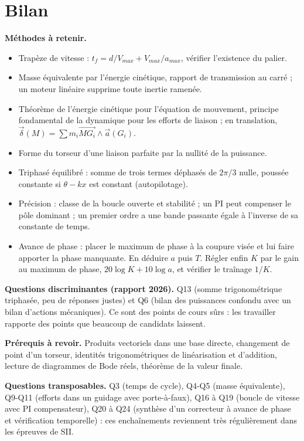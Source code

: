 \documentclass[11pt,a4paper]{article}
\providecommand{\tightlist}{\setlength{\itemsep}{0pt}\setlength{\parskip}{0pt}}
\begin{document}
\hypertarget{bilan}{%
\section{Bilan}\label{bilan}}

\textbf{Méthodes à retenir.}

\begin{itemize}
\tightlist
\item
  Trapèze de vitesse : \(t_f=d/V_{max}+V_{max}/a_{max}\), vérifier l'existence du palier.
\item
  Masse équivalente par l'énergie cinétique, rapport de transmission au carré ; un moteur linéaire supprime toute inertie ramenée.
\item
  Théorème de l'énergie cinétique pour l'équation de mouvement, principe fondamental de la dynamique pour les efforts de liaison ; en translation, \(\vec\delta(M)=\sum m_i\overrightarrow{MG_i}\wedge\vec a(G_i)\).
\item
  Forme du torseur d'une liaison parfaite par la nullité de la puissance.
\item
  Triphasé équilibré : somme de trois termes déphasés de \(2\pi/3\) nulle, poussée constante si \(\theta-kx\) est constant (autopilotage).
\item
  Précision : classe de la boucle ouverte et stabilité ; un PI peut compenser le pôle dominant ; un premier ordre a une bande passante égale à l'inverse de sa constante de temps.
\item
  Avance de phase : placer le maximum de phase à la coupure visée et lui faire apporter la phase manquante. En déduire \(a\) puis \(T\). Régler enfin \(K\) par le gain au maximum de phase, \(20\log K+10\log a\), et vérifier le traînage \(1/K\).
\end{itemize}

\textbf{Questions discriminantes (rapport 2026).} Q13 (somme trigonométrique triphasée, peu de réponses justes) et Q6 (bilan des puissances confondu avec un bilan d'actions mécaniques). Ce sont des points de cours sûrs : les travailler rapporte des points que beaucoup de candidats laissent.

\textbf{Prérequis à revoir.} Produits vectoriels dans une base directe, changement de point d'un torseur, identités trigonométriques de linéarisation et d'addition, lecture de diagrammes de Bode réels, théorème de la valeur finale.

\textbf{Questions transposables.} Q3 (temps de cycle), Q4-Q5 (masse équivalente), Q9-Q11 (efforts dans un guidage avec porte-à-faux), Q16 à Q19 (boucle de vitesse avec PI compensateur), Q20 à Q24 (synthèse d'un correcteur à avance de phase et vérification temporelle) : ces enchaînements reviennent très régulièrement dans les épreuves de SII.
\end{document}
